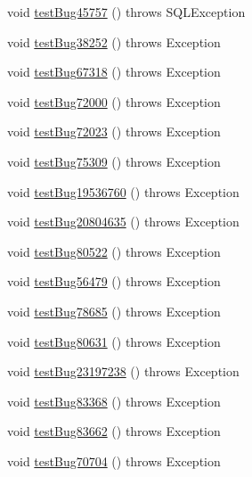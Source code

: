\begin{DoxyCompactItemize}
void \mbox{\hyperlink{classtestsuite_1_1regression_1_1_result_set_regression_test_a38aab06b61d59c04df60b2ffd7dd9861}{test\+Bug45757}} ()  throws S\+Q\+L\+Exception 
\item 
void \mbox{\hyperlink{classtestsuite_1_1regression_1_1_result_set_regression_test_ae79fca0bd7d22ac046c30b0e69ae46e5}{test\+Bug38252}} ()  throws Exception 
\item 
void \mbox{\hyperlink{classtestsuite_1_1regression_1_1_result_set_regression_test_a1ef1850491041aac8a3c98968d839a10}{test\+Bug67318}} ()  throws Exception 
\item 
void \mbox{\hyperlink{classtestsuite_1_1regression_1_1_result_set_regression_test_ac5cb7a4e2ccabb68566100d643272bb4}{test\+Bug72000}} ()  throws Exception 
\item 
void \mbox{\hyperlink{classtestsuite_1_1regression_1_1_result_set_regression_test_a86a107fd1b712bfc306b455d84d42572}{test\+Bug72023}} ()  throws Exception 
\item 
void \mbox{\hyperlink{classtestsuite_1_1regression_1_1_result_set_regression_test_a21e609d74da6fad0483aeeec66375c7d}{test\+Bug75309}} ()  throws Exception 
\item 
void \mbox{\hyperlink{classtestsuite_1_1regression_1_1_result_set_regression_test_a84aedc11c7b191cccc83a821ad7b3927}{test\+Bug19536760}} ()  throws Exception 
\item 
void \mbox{\hyperlink{classtestsuite_1_1regression_1_1_result_set_regression_test_a73eb842a830acedbf8af195858dfc58f}{test\+Bug20804635}} ()  throws Exception 
\item 
void \mbox{\hyperlink{classtestsuite_1_1regression_1_1_result_set_regression_test_ad8d477bdbce9cdf7a7934f944d398fb3}{test\+Bug80522}} ()  throws Exception 
\item 
void \mbox{\hyperlink{classtestsuite_1_1regression_1_1_result_set_regression_test_a67434549c3d855d48d611b6eff810242}{test\+Bug56479}} ()  throws Exception 
\item 
void \mbox{\hyperlink{classtestsuite_1_1regression_1_1_result_set_regression_test_a438ea870d217dc3c5a0df443b040c99f}{test\+Bug78685}} ()  throws Exception 
\item 
void \mbox{\hyperlink{classtestsuite_1_1regression_1_1_result_set_regression_test_a6e1a80555921fe0d80bc15731cb1d63d}{test\+Bug80631}} ()  throws Exception 
\item 
void \mbox{\hyperlink{classtestsuite_1_1regression_1_1_result_set_regression_test_ac1e7b24d29571cdb490adf701dafaf34}{test\+Bug23197238}} ()  throws Exception 
\item 
void \mbox{\hyperlink{classtestsuite_1_1regression_1_1_result_set_regression_test_a863a946bd6da03a3bdf873749470d8ff}{test\+Bug83368}} ()  throws Exception 
\item 
void \mbox{\hyperlink{classtestsuite_1_1regression_1_1_result_set_regression_test_a75450f04071c7d70db843360e616af67}{test\+Bug83662}} ()  throws Exception 
\item 
void \mbox{\hyperlink{classtestsuite_1_1regression_1_1_result_set_regression_test_adff3e595315840e31279f6e60ea8ae4c}{test\+Bug70704}} ()  throws Exception 
\end{DoxyCompactItemize}
